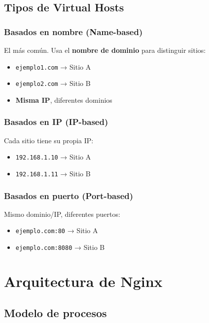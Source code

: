 \documentclass[11pt,a4paper]{article}
\begin{document}
\subsection{Tipos de Virtual Hosts}

\subsubsection{Basados en nombre (Name-based)}
El más común. Usa el \textbf{nombre de dominio} para distinguir sitios:
\begin{itemize}
    \item \texttt{ejemplo1.com} → Sitio A
    \item \texttt{ejemplo2.com} → Sitio B
    \item \textbf{Misma IP}, diferentes dominios
\end{itemize}

\subsubsection{Basados en IP (IP-based)}
Cada sitio tiene su propia IP:
\begin{itemize}
    \item \texttt{192.168.1.10} → Sitio A
    \item \texttt{192.168.1.11} → Sitio B
\end{itemize}

\subsubsection{Basados en puerto (Port-based)}
Mismo dominio/IP, diferentes puertos:
\begin{itemize}
    \item \texttt{ejemplo.com:80} → Sitio A
    \item \texttt{ejemplo.com:8080} → Sitio B
\end{itemize}

\section{Arquitectura de Nginx}

\subsection{Modelo de procesos}
\end{document}
